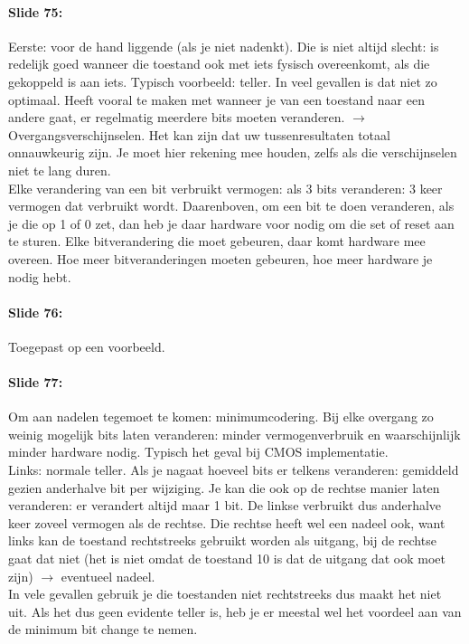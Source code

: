 \documentclass[10pt,a4paper]{book}
\begin{document}
\paragraph{Slide 75:} Eerste: voor de hand liggende (als je niet nadenkt). Die is niet altijd slecht: is redelijk goed wanneer die toestand ook met iets fysisch overeenkomt, als die gekoppeld is aan iets. Typisch voorbeeld: teller. In veel gevallen is dat niet zo optimaal. Heeft vooral te maken met wanneer je van een toestand naar een andere gaat, er regelmatig meerdere bits moeten veranderen. $\rightarrow$ Overgangsverschijnselen. Het kan zijn dat uw tussenresultaten totaal onnauwkeurig zijn. Je moet hier rekening mee houden, zelfs als die verschijnselen niet te lang duren.\\
Elke verandering van een bit verbruikt vermogen: als 3 bits veranderen: 3 keer vermogen dat verbruikt wordt. Daarenboven, om een bit te doen veranderen, als je die op 1 of 0 zet, dan heb je daar hardware voor nodig om die set of reset aan te sturen. Elke bitverandering die moet gebeuren, daar komt hardware mee overeen. Hoe meer bitveranderingen moeten gebeuren, hoe meer hardware je nodig hebt.

\paragraph{Slide 76:} Toegepast op een voorbeeld.

\paragraph{Slide 77:} Om aan nadelen tegemoet te komen: minimumcodering. Bij elke overgang zo weinig mogelijk bits laten veranderen: minder vermogenverbruik en waarschijnlijk minder hardware nodig. Typisch het geval bij CMOS implementatie.\\
Links: normale teller. Als je nagaat hoeveel bits er telkens veranderen: gemiddeld gezien anderhalve bit per wijziging. Je kan die ook op de rechtse manier laten veranderen: er verandert altijd maar 1 bit. De linkse verbruikt dus anderhalve keer zoveel vermogen als de rechtse. Die rechtse heeft wel een nadeel ook, want links kan de toestand rechtstreeks gebruikt worden als uitgang, bij de rechtse gaat dat niet (het is niet omdat de toestand 10 is dat de uitgang dat ook moet zijn) $\rightarrow$ eventueel nadeel.\\
In vele gevallen gebruik je die toestanden niet rechtstreeks dus maakt het niet uit. Als het dus geen evidente teller is, heb je er meestal wel het voordeel aan van de minimum bit change te nemen.
\end{document}
